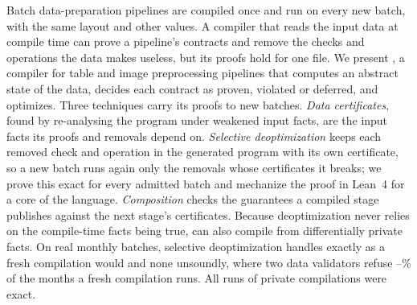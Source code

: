 Batch data-preparation pipelines are compiled once and run on every new batch, with the same layout
and other values. A compiler that reads the input data at compile time can prove a
pipeline's contracts and remove the checks and operations the data makes useless, but its proofs hold
for one file. We present \PL, a compiler for table and image preprocessing pipelines that computes an
abstract state of the data, decides each contract as proven, violated or deferred, and optimizes.
Three techniques carry its proofs to new batches. \emph{Data certificates}, found by re-analysing the
program under weakened input facts, are the input facts its proofs and removals depend on.
\emph{Selective deoptimization} keeps each removed check and operation in the generated program with
its own certificate, so a new batch runs again only the removals whose certificates it breaks; we prove
this exact for every admitted batch and mechanize the proof in Lean~4 for a core of the language.
\emph{Composition} checks the guarantees a compiled stage publishes against the next stage's
certificates. Because deoptimization never relies on the compile-time facts being true, \PL can also
compile from differentially private facts. On \RealRuns{} real
monthly batches, selective deoptimization handles \RealDeoptCorrect{} exactly
as a fresh compilation would and none unsoundly, where two data validators refuse
\RealValidatorStopMin--\RealValidatorStopMax\% of the months a fresh compilation runs. All \PrivRuns{}
runs of private compilations were exact.
